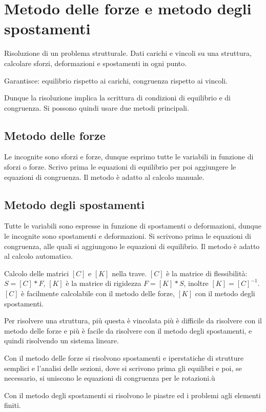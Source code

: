 \section{Metodo delle forze e metodo degli spostamenti}



\begin{definizioneBox}
Risoluzione di un problema strutturale. Dati carichi e  vincoli su una struttura, calcolare sforzi, deformazioni e spostamenti in ogni punto.
\end{definizioneBox}

Garantisce: equilibrio rispetto ai carichi, congruenza rispetto ai vincoli.

Dunque la risoluzione implica la scrittura di condizioni di equilibrio e di congruenza. Si possono quindi usare due metodi principali.

\subsection*{Metodo delle forze}
Le incognite sono sforzi e forze, dunque esprimo tutte le variabili in funzione di sforzi o forze.
Scrivo prima le equazioni di equilibrio per poi aggiungere le equazioni di congruenza. Il metodo è adatto al calcolo manuale.



\subsection*{Metodo degli spostamenti}
Tutte le variabili sono espresse in funzione di spostamenti o deformazioni, dunque le incognite sono spostamenti e deformazioni.
Si scrivono prima le equazioni di congruenza, alle quali si aggiungono le equazioni di equilibrio. Il metodo è adatto al calcolo automatico.


\begin{esempioBox}
Calcolo delle matrici $[C]$ e $[K]$ nella trave. $[C]$ è la matrice di flessibilità: $S = [C] * F$, $[K]$ è la matrice di rigidezza $F = [K]*S$, inoltre $[K] = [C]^{-1}$.
$[C]$ è facilmente calcolabile con il metodo delle forze, $[K]$ con il metodo degli spostamenti.

Per risolvere una struttura, più questa è vincolata più è difficile da risolvere con il metodo delle forze e più è facile da risolvere con il metodo degli spostamenti, e quindi risolvendo un sistema lineare.

Con il metodo delle forze si risolvono spostamenti e iperstatiche di strutture semplici e l'analisi delle sezioni, dove si scrivono prima gli equilibri e poi, se necessario, si uniscono le equazioni di congruenza per le rotazioni.ù

Con il metodo degli spostamenti si risolvono le piastre ed i problemi agli elementi finiti.

\end{esempioBox}
